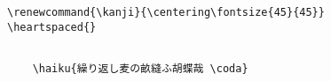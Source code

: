 \documentclass[letterpaper]{article}
\begin{document}
	\vspace*{2cm}
	\renewcommand{\kanji}{\centering\fontsize{40}{40}}
	
	\textcolor{gray}{\kanji{四弘誓願}}
	\vspace*{2cm}
	
	\begin{multicols}{4}
		
		\renewcommand{\kanji}{\centering\fontsize{45}{45}}
		\RLmulticolcolumns
		
\end{multicols}

\begin{verbatim}
\renewcommand{\kanji}{\centering\fontsize{45}{45}}
\heartspaced{}
\end{verbatim}

\pagebreak

\vspace*{2cm}

\begin{multicols}{4}
	\RLmulticolcolumns
	\renewcommand{\kanji}{\centering\fontsize{35}{35}}
\end{multicols}

\begin{verbatim}
 
    \haiku{繰り返し麦の畝縫ふ胡蝶哉 \coda}
    
\end{verbatim}


\pagebreak

\vspace*{1cm}
\renewcommand{\kanji}{\centering\fontsize{25}{25}}
\begin{multicols}{7}
	\RLmulticolcolumns
\end{multicols}
\end{document}
